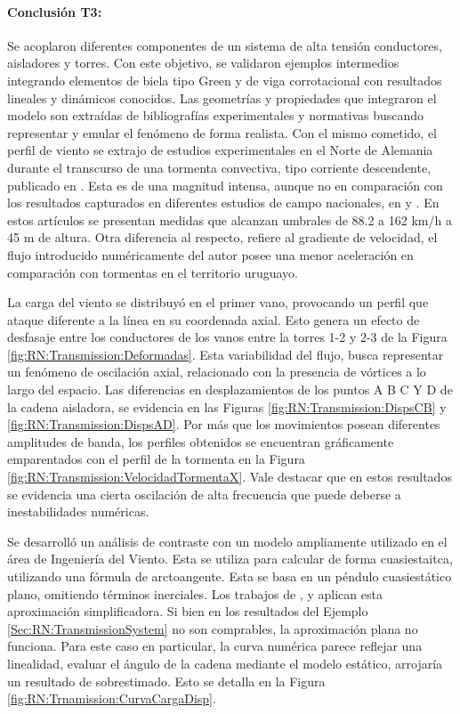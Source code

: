 \paragraph*{Conclusión T3:}
Se acoplaron diferentes componentes de un sistema de alta tensión conductores, aisladores y torres. Con este objetivo, se validaron ejemplos intermedios integrando elementos de biela tipo Green y de viga corrotacional con resultados lineales y dinámicos conocidos. Las geometrías y propiedades que integraron el modelo son extraídas de bibliografías experimentales y normativas buscando representar y emular el fenómeno de forma realista.  Con el mismo cometido, el perfil de viento se extrajo de estudios experimentales en el Norte de Alemania durante el transcurso de una tormenta convectiva, tipo corriente descendente, publicado en \citep{stengel2017measurements}. Esta es de una magnitud intensa, aunque no en comparación con los resultados capturados en diferentes estudios de campo nacionales, en \citep{duranona2009analysis} y \citep{duranona2019first}. En estos artículos se presentan medidas que alcanzan umbrales de 88.2 a 162 km/h a 45 m de altura. Otra diferencia al respecto, refiere al gradiente de velocidad, el flujo introducido numéricamente del autor \citeauthor{stengel2017measurements} posee una menor aceleración en comparación con tormentas en el territorio uruguayo. 

La carga del viento se distribuyó en el primer vano, provocando un perfil que ataque diferente a la línea en su coordenada axial. Esto genera un efecto de desfasaje entre los conductores de los vanos entre la torres 1-2 y 2-3 de la Figura \ref{fig:RN:Transmission:Deformadas}. Esta variabilidad del flujo, busca representar un fenómeno de oscilación axial, relacionado con la presencia de vórtices a lo largo del espacio. Las diferencias en desplazamientos de los puntos A B C Y D de la cadena aisladora, se evidencia en las Figuras \ref{fig:RN:Transmission:DispsCB} y \ref{fig:RN:Transmission:DispsAD}. Por más que los movimientos posean diferentes amplitudes de banda, los perfiles obtenidos se encuentran gráficamente emparentados con el perfil de la tormenta en la Figura \ref{fig:RN:Transmission:VelocidadTormentaX}. Vale destacar que en estos resultados se evidencia una cierta oscilación de alta frecuencia que puede deberse a inestabilidades numéricas.  

Se desarrolló un análisis de contraste con un modelo ampliamente utilizado en el área de Ingeniería del Viento. Esta se utiliza para calcular de forma cuasiestaitca, utilizando una fórmula de arctoangente. Esta se basa en un péndulo cuasiestático plano, omitiendo términos inerciales. Los trabajos de \cite{stengel2017measurements}, \cite{duranona2009analysis} y \cite{yan2009numerical} aplican esta aproximación simplificadora. Si bien en los resultados del Ejemplo \ref{Sec:RN:TransmissionSystem} no son comprables, la aproximación plana no funciona. Para este caso en particular, la curva numérica parece reflejar una linealidad, evaluar el ángulo de la cadena mediante el modelo estático, arrojaría un resultado de sobrestimado. Esto se detalla en la Figura \ref{fig:RN:Trnamission:CurvaCargaDisp}.

